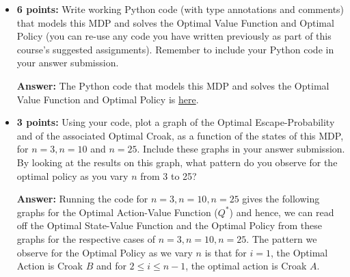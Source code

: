 \documentclass[12pt]{exam}
\begin{document}
\begin{questions}
\begin{itemize}
{\bf Answer: } The state space $\mathcal{S} = \{i \mid 0 \leq i \leq n\}$, with each state $i$ representing the number of the lilypad the frog is on. States $i=0$ and $i=n$ are terminating states. The action space $\mathcal{A} = \{A,B\}$ corresponding to the two choices of croak sounds. The state transitions are given by:
$$
Pr[i' \mid (i,A)]  \text{ for } 1 \leq i \leq n-1 =
\begin{cases}
\frac i n & \text{ for } i' = i - 1\\
\frac {n-1} n  & \text{ for } i' = i + 1\\
0 & \text{ otherwise}
\end{cases}
$$
$$
Pr[i' \mid (i,B)]  \text{ for } 1 \leq i \leq n-1 =
\begin{cases}
 \frac 1 n & \text{ for all } 0 \leq i' \leq n \text{ and } i' \neq i\\
 0 & \text{for } i' = i
 \end{cases}
$$
Let us define $R(i, a, i')$ as the {\em Reward} when transitioning to state $i'$ from state $i$ upon taking action $a$.
$$
R(i, a, i') \text{ for } 1\leq i \leq n-1, a \in \{A,B\} = 
\begin{cases}
1 & \text{ for } i' = n\\
0 & \text{ otherwise}
\end{cases}
$$

\item {\bf 6 points:} Write working Python code (with type annotations and comments) that models this MDP and solves the Optimal Value Function and Optimal Policy (you can re-use any code you have written previously as part of this course's suggested assignments). Remember to include your Python code in your answer submission.

{\bf Answer:} The Python code that models this MDP and solves the Optimal Value Function and Optimal Policy is \href{https://github.com/coverdrive/MDP-DP-RL/blob/master/src/examples/exam_problems/frog_lilypad.py}{here}.

\item {\bf 3 points:} Using your code, plot a graph of the Optimal Escape-Probability and of the associated Optimal Croak, as a function of the states of this MDP, for $n=3, n=10$ and $n=25$. Include these graphs in your answer submission. By looking at the results on this graph, what pattern do you observe for the optimal policy as you vary $n$ from 3 to 25? 

{\bf Answer:} Running the code for $n=3, n=10, n=25$ gives the following graphs for the Optimal Action-Value Function ($Q^*$) and hence, we can read off the Optimal State-Value Function and the Optimal Policy from these graphs for the respective cases of $n=3, n=10, n=25$. The pattern we observe for the Optimal Policy as we vary $n$ is that for $i=1$, the Optimal Action is Croak $B$ and for $2 \leq i \leq n-1$, the optimal action is Croak $A$.


\end{itemize}
\end{questions}
\end{document}
